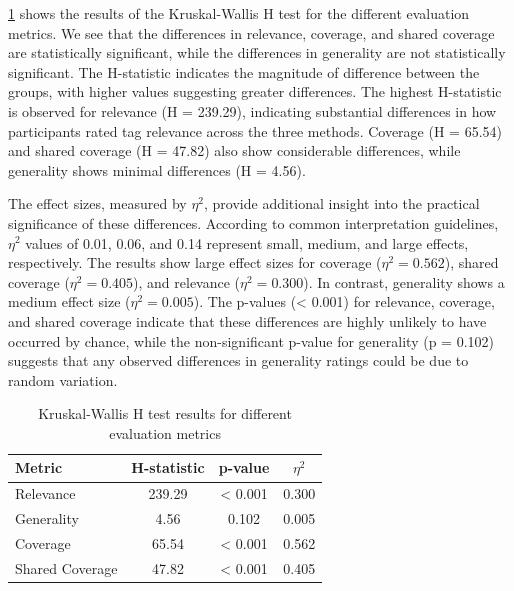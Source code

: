 \cref{tab:kruskal_wallis} shows the results of the Kruskal-Wallis H test for the different evaluation metrics. We see that the differences in relevance, coverage, and shared coverage are statistically significant, while the differences in generality are not statistically significant. The H-statistic indicates the magnitude of difference between the groups, with higher values suggesting greater differences. The highest H-statistic is observed for relevance (H = 239.29), indicating substantial differences in how participants rated tag relevance across the three methods. Coverage (H = 65.54) and shared coverage (H = 47.82) also show considerable differences, while generality shows minimal differences (H = 4.56).

The effect sizes, measured by $\eta^2$, provide additional insight into the practical significance of these differences. According to common interpretation guidelines, $\eta^2$ values of 0.01, 0.06, and 0.14 represent small, medium, and large effects, respectively. The results show large effect sizes for coverage ($\eta^2 = 0.562$), shared coverage ($\eta^2 = 0.405$), and relevance ($\eta^2 = 0.300$). In contrast, generality shows a medium effect size ($\eta^2 = 0.005$). The p-values (< 0.001) for relevance, coverage, and shared coverage indicate that these differences are highly unlikely to have occurred by chance, while the non-significant p-value for generality (p = 0.102) suggests that any observed differences in generality ratings could be due to random variation.

\begin{table}[h]
    \centering
    \begin{tabular}{lccc}
        \hline
        \textbf{Metric} & \textbf{H-statistic} & \textbf{p-value} & \textbf{$\eta^2$} \\
        \hline
        Relevance       & 239.29               & < 0.001          & 0.300             \\
        Generality      & 4.56                 & 0.102            & 0.005             \\
        Coverage        & 65.54                & < 0.001          & 0.562             \\
        Shared Coverage & 47.82                & < 0.001          & 0.405             \\
        \hline
    \end{tabular}
    \caption{Kruskal-Wallis H test results for different evaluation metrics}
    \label{tab:kruskal_wallis}
\end{table}

